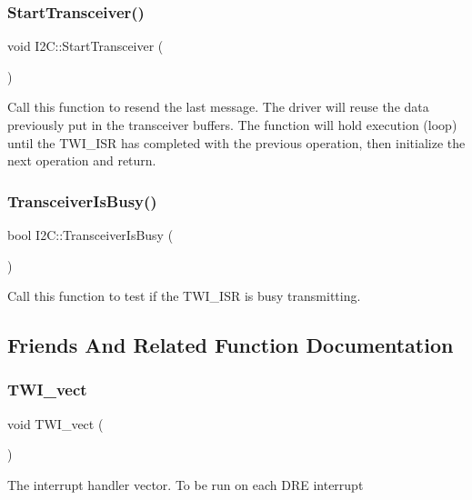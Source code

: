 \subsubsection{\texorpdfstring{Start\+Transceiver()}{StartTransceiver()}}
{\footnotesize\ttfamily void I2\+C\+::\+Start\+Transceiver (\begin{DoxyParamCaption}{ }\end{DoxyParamCaption})}

Call this function to resend the last message. The driver will reuse the data previously put in the transceiver buffers. The function will hold execution (loop) until the T\+W\+I\+\_\+\+I\+SR has completed with the previous operation, then initialize the next operation and return. \hypertarget{class_i2_c_a3e6747576e7d4abf506296f8675ec3b5}{}\label{class_i2_c_a3e6747576e7d4abf506296f8675ec3b5} 
\subsubsection{\texorpdfstring{Transceiver\+Is\+Busy()}{TransceiverIsBusy()}}
{\footnotesize\ttfamily bool I2\+C\+::\+Transceiver\+Is\+Busy (\begin{DoxyParamCaption}{ }\end{DoxyParamCaption})}

Call this function to test if the T\+W\+I\+\_\+\+I\+SR is busy transmitting. 

\subsection{Friends And Related Function Documentation}
\hypertarget{class_i2_c_a9d6ec6457f300cca833eb7193feabfbc}{}\label{class_i2_c_a9d6ec6457f300cca833eb7193feabfbc} 
\subsubsection{\texorpdfstring{T\+W\+I\+\_\+vect}{TWI\_vect}}
{\footnotesize\ttfamily void T\+W\+I\+\_\+vect (\begin{DoxyParamCaption}{ }\end{DoxyParamCaption})\hspace{0.3cm}{\ttfamily [friend]}}

The interrupt handler vector. To be run on each D\+RE interrupt 

